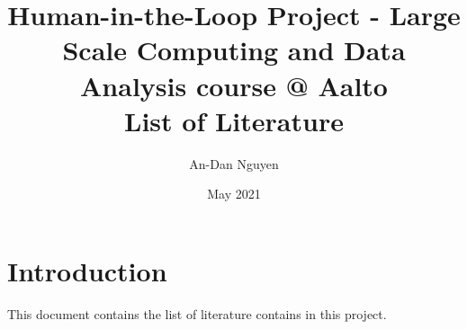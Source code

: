 \documentclass{article}
\title{Human-in-the-Loop Project - Large Scale Computing and Data Analysis course @ Aalto\\List of Literature}
\author{An-Dan Nguyen}
\date{May 2021}
\begin{document}
\maketitle

\section{Introduction}
This document contains the list of literature contains in this project.

\nocite{*}


\end{document}
